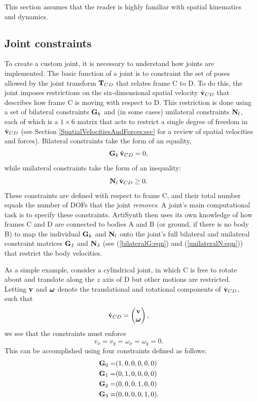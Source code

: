 This section assumes that the reader is highly familiar with spatial
kinematics and dynamics.

\subsection{Joint constraints}
\label{JointConstraints:sec}

To create a custom joint, it is necessary to understand how joints are
implemented. The basic function of a joint is to constraint the set of
poses allowed by the joint transform ${\bf T}_{CD}$ that relates frame C to
D. To do this, the joint imposes restrictions on the six-dimensional
spatial velocity $\hat{{\bf v}}_{CD}$ that describes how frame C is moving
with respect to D.  This restriction is done using a set of bilateral
constraints ${\bf G}_k$ and (in some cases) unilateral constraints ${\bf N}_l$,
each of which is a $1 \times 6$ matrix that acts to restrict a single
degree of freedom in $\hat{{\bf v}}_{CD}$ (see Section
\ref{SpatialVelocitiesAndForces:sec} for a review of
spatial velocities and forces). Bilateral constraints take the form of
an equality,
%
\begin{equation}
{\bf G}_k \, \hat{{\bf v}}_{CD} = 0,
\label{cbilateral:eqn}
\end{equation}
%
while unilateral constraints take the form of an inequality:
%
\begin{equation}
{\bf N}_l \, \hat{{\bf v}}_{CD} \ge 0.
\label{cunilateral:eqn}
\end{equation}
%
These constraints are defined with respect to frame C, and their total
number equals the number of DOFs that the joint {\it removes}. A
joint's main computational task is to specify these
constraints. ArtiSynth then uses its own knowledge of how frames C and
D are connected to bodies A and B (or ground, if there is no body B)
to map the individual ${\bf G}_k$ and ${\bf N}_l$ onto the joint's full
bilateral and unilateral constraint matrices ${\bf G}_\text{J}$ and ${\bf N}_\text{J}$ (see
(\ref{bilateralG:eqn}) and (\ref{unilateralN:eqn})) that restrict the
body velocities.

As a simple example, consider a cylindrical joint, in which C is free
to rotate about and translate along the $z$ axis of D but other
motions are restricted. Letting ${\bf v}$ and $\boldsymbol\omega$ denote the
translational and rotational components of $\hat{{\bf v}}_{CD}$, such that
%
\begin{equation*}
\hat{{\bf v}}_{CD} = \left(\begin{matrix} {\bf v} \\ \boldsymbol\omega \end{matrix}\right),
\end{equation*}
%
we see that the constraints must enforce
%
\begin{equation}
v_x = v_y = \omega_x = \omega_y = 0.
\end{equation}
%
This can be accomplished using four constraints defined as follows:
%
\begin{align*}
{\bf G}_0 = & (1, 0, 0, 0, 0, 0) \\
{\bf G}_1 = & (0, 1, 0, 0, 0, 0) \\
{\bf G}_2 = & (0, 0, 0, 1, 0, 0) \\
{\bf G}_3 = & (0, 0, 0, 0, 1, 0).
\end{align*}
%

